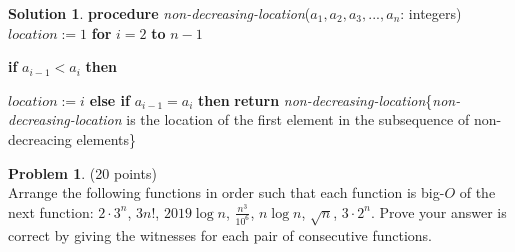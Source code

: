 \documentclass{article}
\theoremstyle{definition}
\newtheorem{problem}{Problem}
\newtheorem*{solution}{Solution}
\begin{document}
\begin{solution}
\item
\textbf{procedure} \textit{non-decreasing-location}(\textit{$a_1, a_2, a_3,...,a_n$}: integers)\newline
$location:=1$\newline
\textbf{for} $i=2$ \textbf{to} $n-1$\par
	\textbf{if} $a_{i-1} < a_i$ \textbf{then}\par
    	$location:=i$\newline
        \textbf{else if} $a_{i-1} = a_i$ \textbf{then}\newline
        \textbf{return} \textit{non-decreasing-location}\{\textit{non-decreasing-location} is the location of the first element in the subsequence of non-decreacing elements\}

\end{solution}

\newpage

\begin{problem} (20 points)\\
Arrange the following functions in order such that each function is big-$O$ of the next function:  $2\cdot3^n$, $3n!$, $2019\log{n}$, $\displaystyle \frac{n^3}{10^6}$, $n\log{n}$,  $\sqrt{n}$, $3\cdot2^n$.  Prove your answer is correct by giving the witnesses for each pair of consecutive functions.
\end{problem}
\end{document}
